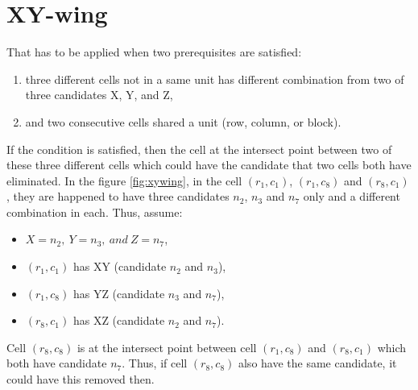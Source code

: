 \documentclass[11pt]{report}
\begin{document}
\section{XY-wing}
\label{sec:XY-wing}
That has to be applied when two prerequisites are satisfied:
\begin{enumerate}
\item three different cells not in a same unit has different combination from two of three candidates  X, Y, and Z,
\item and two consecutive cells shared a unit (row, column, or block).
\end{enumerate}
If the condition is satisfied, then the cell at the intersect point between two of these three different cells which could have the candidate that two cells both have eliminated.
In the figure \ref{fig:xywing}, in the cell $(r_{1}, c_{1})$, $(r_{1}, c_{8})$ and $(r_{8}, c_{1})$, they are happened to have three candidates $n_{2}$, $n_{3}$ and $n_{7}$ only and a different combination in each. Thus, assume:
\begin{itemize}
\item $X = n_{2},\ Y = n_{3},\ and\ Z = n_{7}$,
\item $(r_{1}, c_{1})$ has XY (candidate $n_{2}$ and $n_{3}$),
\item $(r_{1}, c_{8})$ has YZ (candidate $n_{3}$ and $n_{7}$),
\item $(r_{8}, c_{1})$ has XZ (candidate $n_{2}$ and $n_{7}$).
\end{itemize}
Cell $(r_{8}, c_{8})$ is at the intersect point between cell $(r_{1}, c_{8})$ and $(r_{8}, c_{1})$ which both have candidate $n_{7}$. Thus, if cell $(r_{8}, c_{8})$ also have the same candidate, it could have this removed then.
\end{document}
